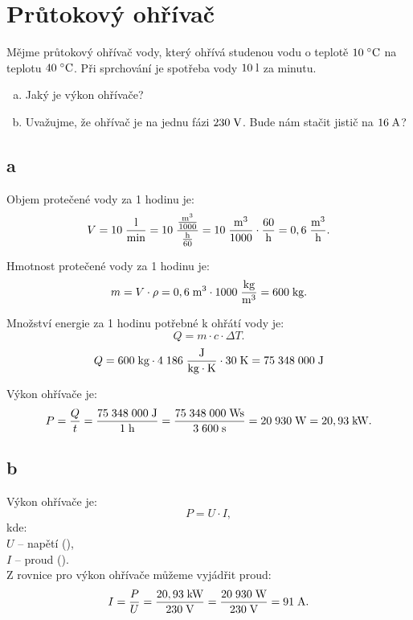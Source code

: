 \documentclass{article}
\begin{document}
\section{ Průtokový ohřívač \spicy}
Mějme průtokový ohřívač vody, který ohřívá studenou vodu o teplotě $10 \; ^\circ \textrm{C}$ \fs na teplotu $40 \; ^\circ \textrm{C}$. Při sprchování je spotřeba vody $10 \; \textrm{l}$ za minutu.

\begin{enumerate}[a)]
    \item Jaký je výkon ohřívače?
    \item Uvažujme, že ohřívač je na jednu fázi $230 \; \textrm{V}$. Bude nám stačit jistič na $16 \; \textrm{A}$?
\end{enumerate}


\subsection{a}

Objem protečené vody za 1 hodinu je:
$$
    V = 10 \; \frac{\textrm{l}}{\textrm{min}} = 10 \; \frac{\frac{\textrm{m}^{\textrm{3}}}{1000}}{\frac{\textrm{h}}{60}} = 10 \; \frac{\textrm{m}^{\textrm{3}}}{1000} \cdot \frac{60}{\textrm{h}} = 0,6 \; \frac{\textrm{m}^{\textrm{3}}}{\textrm{h}}.
$$

Hmotnost protečené vody za 1 hodinu je:
$$
    m = V \cdot \rho = 0,6 \; \textrm{m}^{\textrm{3}} \cdot 1 000 \; \frac{\textrm{kg}}{\textrm{m}^{\textrm{3}}} = 600 \; \textrm{kg}.
$$

Množství energie za 1 hodinu potřebné k ohřátí vody je:
$$
    Q = m \cdot c \cdot \Delta T.
$$
$$
    Q = 600 \; \textrm{kg} \cdot 4 \; 186 \; \frac{\textrm{J}}{\textrm{kg} \cdot \textrm{K}} \cdot 30 \; \textrm{K} = 75 \; 348 \; 000 \; \textrm{J}
$$

Výkon ohřívače je:
$$
    P = \frac{Q}{t} = \frac{75 \; 348 \; 000 \; \textrm{J}}{1 \; \textrm{h}} = \frac{75 \; 348 \; 000 \; \textrm{Ws}}{3 \; 600 \; \textrm{s}} = 20 \; 930 \; \textrm{W} = 20,93 \; \textrm{kW}.
$$


\subsection{b}

Výkon ohřívače je:
$$
    P = U \cdot I,
$$
kde:\\
$U$ -- napětí (\ueqV),\\
$I$ -- proud (\ueqA).\\

Z rovnice pro výkon ohřívače můžeme vyjádřit proud:
$$
    I = \frac{P}{U} = \frac{20,93 \; \textrm{kW}}{230 \; \textrm{V}} = \frac{20 \; 930 \; \textrm{W}}{230 \; \textrm{V}} = 91 \; \textrm{A}.
$$
\end{document}
